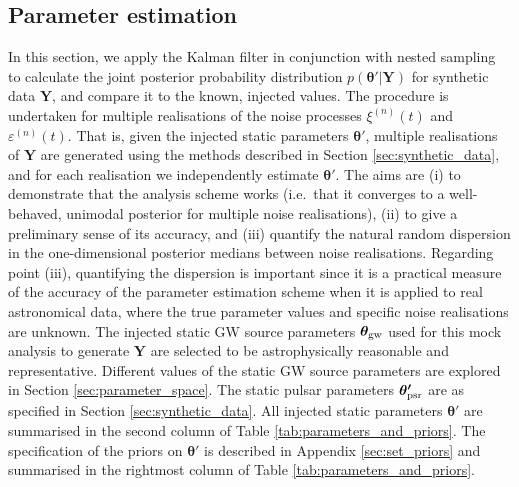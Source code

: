 \documentclass[fleqn,usenatbib,useAMS]{mnras}
\begin{document}
 
\subsection{Parameter estimation} \label{sec:pe_and_ms} 
In this section, we apply the Kalman filter in conjunction with nested sampling to calculate the joint posterior probability distribution $p({\boldsymbol{\theta'}} | {\boldsymbol{Y}})$ for synthetic data $\boldsymbol{Y}$, and compare it to the known, injected values. The procedure is undertaken for multiple realisations of the noise processes $\xi^{(n)}(t)$ and $\varepsilon^{(n)}(t)$. That is, given the injected static parameters $\boldsymbol{\theta'}$, multiple realisations of $\boldsymbol{Y}$ are generated using the methods described in Section \ref{sec:synthetic_data}, and for each realisation we independently estimate $\boldsymbol{\theta'}$. The aims are (i) to demonstrate that the analysis scheme works (i.e.\ that it converges to a well-behaved, unimodal posterior for multiple noise realisations), (ii) to give a preliminary sense of its accuracy, and (iii) quantify the natural random dispersion in the one-dimensional posterior medians between noise realisations. 
Regarding point (iii), quantifying the dispersion is important since it is a practical measure of the accuracy of the parameter estimation scheme when it is applied to real astronomical data, where the true parameter values and specific noise realisations are unknown. The injected static GW source parameters $\boldsymbol{\theta}_{\rm gw}$ used for this mock analysis to generate $\boldsymbol{Y}$ are selected to be astrophysically reasonable and representative. Different values of the static GW source parameters are explored in Section \ref{sec:parameter_space}. The static pulsar parameters $\boldsymbol{\theta'}_{\rm psr}$  are as specified in Section \ref{sec:synthetic_data}. All injected static parameters $\boldsymbol{\theta}'$ are summarised in the second column of Table \ref{tab:parameters_and_priors}. The specification of the priors on $\boldsymbol{\theta'}$ is described in Appendix \ref{sec:set_priors} and summarised in the rightmost column of Table \ref{tab:parameters_and_priors}. \newline
\end{document}
